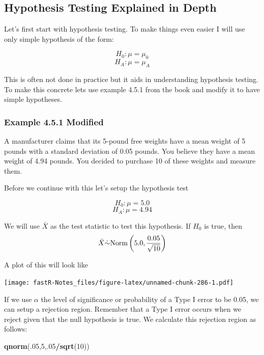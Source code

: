 \documentclass[]{book}
\newenvironment{Shaded}{\begin{snugshade}}{\end{snugshade}}
\newcommand{\KeywordTok}[1]{\textcolor[rgb]{0.13,0.29,0.53}{\textbf{#1}}}
\newcommand{\DecValTok}[1]{\textcolor[rgb]{0.00,0.00,0.81}{#1}}
\newcommand{\OperatorTok}[1]{\textcolor[rgb]{0.81,0.36,0.00}{\textbf{#1}}}
\newcommand{\NormalTok}[1]{#1}
\theoremstyle{definition}
\theoremstyle{definition}
\theoremstyle{definition}
\theoremstyle{remark}
\begin{document}
\subsection{Hypothesis Testing Explained in
Depth}\label{hypothesis-testing-explained-in-depth}

Let's first start with hypothesis testing. To make things even easier I
will use only simple hypothesis of the form:

\[H_{0}: \mu = \mu_{0}\] \[H_{A}: \mu = \mu_{A}\]

This is often not done in practice but it aids in understanding
hypothesis testing. To make this concrete lets use example 4.5.1 from
the book and modify it to have simple hypotheses.

\subsubsection{Example 4.5.1 Modified}\label{example-4.5.1-modified}

A manufacturer claims that its 5-pound free weights have a mean weight
of 5 pounds with a standard deviation of 0.05 pounds. You believe they
have a mean weight of 4.94 pounds. You decided to purchase 10 of these
weights and measure them.

Before we continue with this let's setup the hypothesis test

\[H_{0}: \mu = 5.0\] \[H_{A}: \mu = 4.94\]

We will use \(\bar{X}\) as the test statistic to test this hypothesis.
If \(H_{0}\) is true, then\\
\[\bar{X}\dot{\sim}\mbox{Norm}\left(5.0,{0.05 \over \sqrt{10}}\right)\]

A plot of this will look like

\texttt{[image: fastR-Notes\_files/figure-latex/unnamed-chunk-286-1.pdf]}

If we use \(\alpha\) the level of significance or probability of a Type
I error to be 0.05, we can setup a rejection region. Remember that a
Type I error occurs when we reject given that the null hypothesis is
true. We calculate this rejection region as follows:

\begin{Shaded}
\begin{Highlighting}[]
\KeywordTok{qnorm}\NormalTok{(.}\DecValTok{05}\NormalTok{,}\DecValTok{5}\NormalTok{,.}\DecValTok{05}\OperatorTok{/}\KeywordTok{sqrt}\NormalTok{(}\DecValTok{10}\NormalTok{))}
\end{Highlighting}
\end{Shaded}
\end{document}
